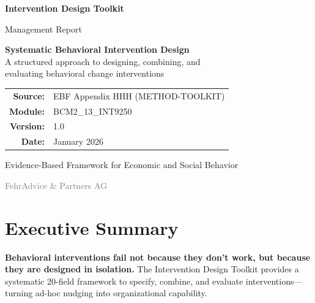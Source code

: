 \documentclass[11pt,a4paper]{article}
\begin{document}
\begin{titlepage}
\centering
\vspace*{2cm}

{\Huge\bfseries\color{primaryblue} Intervention Design Toolkit}

\vspace{0.5cm}
{\LARGE\color{primaryblue!70} Management Report}

\vspace{2cm}

\begin{tcolorbox}[colback=lightgray, colframe=primaryblue, width=12cm]
\centering
\large
\textbf{Systematic Behavioral Intervention Design}\\[0.5em]
A structured approach to designing, combining, and\\
evaluating behavioral change interventions
\end{tcolorbox}

\vspace{2cm}

\begin{tabular}{rl}
\textbf{Source:} & EBF Appendix HHH (METHOD-TOOLKIT) \\
\textbf{Module:} & BCM2\_13\_INT9250 \\
\textbf{Version:} & 1.0 \\
\textbf{Date:} & January 2026 \\
\end{tabular}

\vfill

{\large Evidence-Based Framework for Economic and Social Behavior}

\vspace{1cm}
{\small\textcolor{gray}{FehrAdvice \& Partners AG}}

\end{titlepage}

\section*{Executive Summary}

\begin{tcolorbox}[colback=primaryblue!5, colframe=primaryblue, title=\textbf{Key Message}]
\textbf{Behavioral interventions fail not because they don't work, but because they are designed in isolation.} The Intervention Design Toolkit provides a systematic 20-field framework to specify, combine, and evaluate interventions---turning ad-hoc nudging into organizational capability.
\end{tcolorbox}
\end{document}
